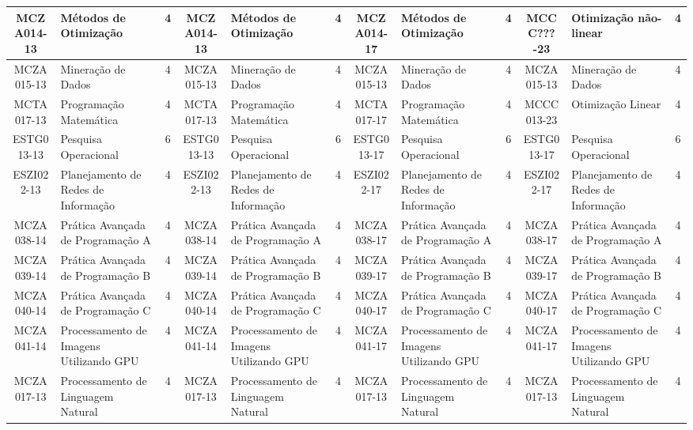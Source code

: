 \documentclass[a4paper]{article}
\begin{document}
\begin{landscape}
{\begin{longtable}{|c|p{.2\textheight}|c||c|p{.2\textheight}|c||c|p{.2\textheight}|c||c|p{.2\textheight}|c|}
MCZA014-13 & Métodos de Otimização & 4 &
MCZA014-13 & Métodos de Otimização & 4 &
MCZA014-17 & Métodos de Otimização & 4 &
MCCC???-23 & Otimização não-linear & 4\\ \hline

MCZA015-13 & Mineração de Dados & 4 &
MCZA015-13 & Mineração de Dados & 4 &
MCZA015-13 & Mineração de Dados & 4 &
MCZA015-13 & Mineração de Dados & 4\\ \hline

MCTA017-13 & Programação Matemática & 4 &
MCTA017-13 & Programação Matemática & 4 &
MCTA017-17 & Programação Matemática & 4 &
MCCC013-23 & Otimização Linear & 4 \\ \hline



ESTG013-13 & Pesquisa Operacional & 6 &
ESTG013-13 & Pesquisa Operacional & 6 &
ESTG013-17 & Pesquisa Operacional & 6 &
ESTG013-17 & Pesquisa Operacional & 6\\ \hline

ESZI022-13 & Planejamento de Redes de Informação & 4 &
ESZI022-13 & Planejamento de Redes de Informação & 4 &
ESZI022-17 & Planejamento de Redes de Informação & 4 &
ESZI022-17 & Planejamento de Redes de Informação & 4\\ \hline

MCZA038-14 & Prática Avançada de Programação A & 4 &
MCZA038-14 & Prática Avançada de Programação A & 4 &
MCZA038-17 & Prática Avançada de Programação A & 4 &
MCZA038-17 & Prática Avançada de Programação A & 4\\ \hline

MCZA039-14 & Prática Avançada de Programação B & 4 &
MCZA039-14 & Prática Avançada de Programação B & 4 &
MCZA039-17 & Prática Avançada de Programação B & 4 & 
MCZA039-17 & Prática Avançada de Programação B & 4\\ \hline

MCZA040-14 & Prática Avançada de Programação C & 4 &
MCZA040-14 & Prática Avançada de Programação C & 4 &
MCZA040-17 & Prática Avançada de Programação C & 4 &
MCZA040-17 & Prática Avançada de Programação C & 4\\ \hline

MCZA041-14 & Processamento de Imagens Utilizando GPU & 4 &
MCZA041-14 & Processamento de Imagens Utilizando GPU & 4 &
MCZA041-17 & Processamento de Imagens Utilizando GPU & 4 & 
MCZA041-17 & Processamento de Imagens Utilizando GPU & 4\\ \hline

MCZA017-13 & Processamento de Linguagem Natural & 4 &
MCZA017-13 & Processamento de Linguagem Natural & 4 &
MCZA017-13 & Processamento de Linguagem Natural & 4 &
MCZA017-13 & Processamento de Linguagem Natural & 4\\ \hline


\end{longtable}}
\end{landscape}
\end{document}
